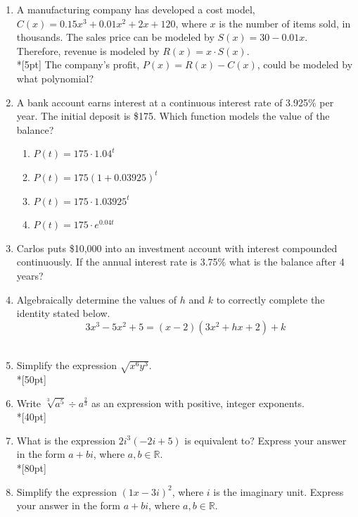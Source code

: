 \documentclass[12pt, oneside]{article}
\begin{document}
\begin{enumerate}
\item A manufacturing company has developed a cost model, $C(x)=0.15x^3+0.01x^2+2x+120$, where $x$ is the number of items sold, in thousands. The sales price can be modeled by $S(x)=30-0.01x$. Therefore, revenue is modeled by $R(x)=x \cdot S(x)$.\\*[5pt]
The company’s profit, $P(x)=R(x)-C(x)$, could be modeled by what polynomial?  %

\newpage

\item A bank account earns interest at a continuous interest rate of 3.925\% per year. The initial deposit is \$175. Which function models the value of the balance?
\begin{enumerate}
    \item $P(t)=175 \cdot 1.04^{t}$
    \item $P(t)=175 (1+0.03925)^{t}$
    \item $P(t)=175 \cdot 1.03925^{t}$
    \item $P(t)=175 \cdot e^{0.04t}$
\end{enumerate}

\item Carlos puts \$10,000 into an investment account with interest compounded continuously. If the annual interest rate is 3.75\% what is the balance after 4 years?\\[80pt]


\item Algebraically determine the values of $h$ and $k$ to correctly complete the identity stated below.
\[3x^3-5x^2+5=(x-2)(3x^2+hx+2)+k\] \\[2in] %


\item Simplify the expression $\sqrt{x^6 y^3}$.\\*[50pt]

\item Write $\sqrt[3]{a^5} \div a^{\frac{2}{3}}$ as an expression with positive, integer exponents.\\*[40pt]

\newpage

\item What is the expression $2i^3(-2i+5)$ is equivalent to? Express your answer in the form $a+bi$, where $a, b \in \mathbb{R}$.\\*[80pt]  %

\item Simplify the expression $(1x - 3i)^2$, where $i$ is the imaginary unit. Express your answer in the form $a+bi$, where $a, b \in \mathbb{R}$.\\[80pt] %


\end{enumerate}
\end{document}
